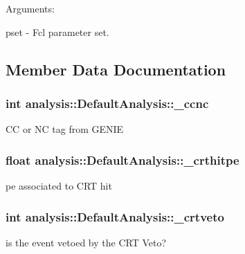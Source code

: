 Arguments\+:

pset -\/ Fcl parameter set. 

\subsection{Member Data Documentation}
\subsubsection[{\texorpdfstring{\+\_\+ccnc}{_ccnc}}]{\setlength{\rightskip}{0pt plus 5cm}int analysis\+::\+Default\+Analysis\+::\+\_\+ccnc\hspace{0.3cm}{\ttfamily [private]}}\hypertarget{classanalysis_1_1DefaultAnalysis_ac2df5c78c8d06e090d0b6cd195fa83d8}{}\label{classanalysis_1_1DefaultAnalysis_ac2df5c78c8d06e090d0b6cd195fa83d8}
CC or NC tag from G\+E\+N\+IE 
\subsubsection[{\texorpdfstring{\+\_\+crthitpe}{_crthitpe}}]{\setlength{\rightskip}{0pt plus 5cm}float analysis\+::\+Default\+Analysis\+::\+\_\+crthitpe\hspace{0.3cm}{\ttfamily [private]}}\hypertarget{classanalysis_1_1DefaultAnalysis_a900ec35e3ca4a00d4625a1e632bb6b40}{}\label{classanalysis_1_1DefaultAnalysis_a900ec35e3ca4a00d4625a1e632bb6b40}
pe associated to C\+RT hit 
\subsubsection[{\texorpdfstring{\+\_\+crtveto}{_crtveto}}]{\setlength{\rightskip}{0pt plus 5cm}int analysis\+::\+Default\+Analysis\+::\+\_\+crtveto\hspace{0.3cm}{\ttfamily [private]}}\hypertarget{classanalysis_1_1DefaultAnalysis_a84ce9904fa527012a65c2be203a38d38}{}\label{classanalysis_1_1DefaultAnalysis_a84ce9904fa527012a65c2be203a38d38}
is the event vetoed by the C\+RT Veto? 
